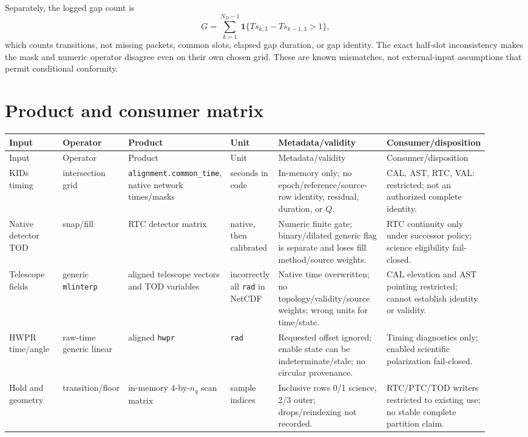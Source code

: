 \documentclass[11pt]{article}
\newcommand{\code}[1]{\nolinkurl{#1}}
\begin{document}
Separately, the logged gap count is
\[
 G=\sum_{k=1}^{N_D-1}\mathbf 1\{Ts_{k,3}-Ts_{k-1,3}>1\},
\]
which counts transitions, not missing packets, common slots, elapsed gap
duration, or gap identity.  The exact half-slot inconsistency makes the mask
and numeric operator disagree even on their own chosen grid.  These are known
mismatches, not external-input assumptions that permit conditional conformity.

\section{Product and consumer matrix}

\begin{longtable}{L{0.12\linewidth}L{0.13\linewidth}L{0.15\linewidth}L{0.08\linewidth}L{0.24\linewidth}L{0.20\linewidth}}
\toprule
Input & Operator & Product & Unit & Metadata/validity & Consumer/disposition\\
\midrule
\endfirsthead
\toprule
Input & Operator & Product & Unit & Metadata/validity & Consumer/disposition\\
\midrule
\endhead
KIDs timing & intersection grid & \code{alignment.common_time}, native network times/masks & seconds in code & In-memory only; no epoch/reference/source-row identity, residual, duration, or $Q$. & CAL, AST, RTC, VAL: restricted; not an authorized complete identity.\\
Native detector TOD & snap/fill & RTC detector matrix & native, then calibrated & Numeric finite gate; binary/dilated generic flag is separate and loses fill method/source weights. & RTC continuity only under successor policy; science eligibility fail-closed.\\
Telescope fields & generic \code{mlinterp} & aligned telescope vectors and TOD variables & incorrectly all \code{rad} in NetCDF & Native time overwritten; no topology/validity/source weights; wrong units for time/state. & CAL elevation and AST pointing restricted; cannot establish identity or validity.\\
HWPR time/angle & raw-time generic linear & aligned \code{hwpr} & \code{rad} & Requested offset ignored; enable state can be indeterminate/stale; no circular provenance. & Timing diagnostics only; enabled scientific polarization fail-closed.\\
Hold and geometry & transition/floor & in-memory 4-by-$n_q$ scan matrix & sample indices & Inclusive rows 0/1 science, 2/3 outer; drops/reindexing not recorded. & RTC/PTC/TOD writers restricted to existing use; no stable complete partition claim.\\

\end{longtable}
\end{document}
